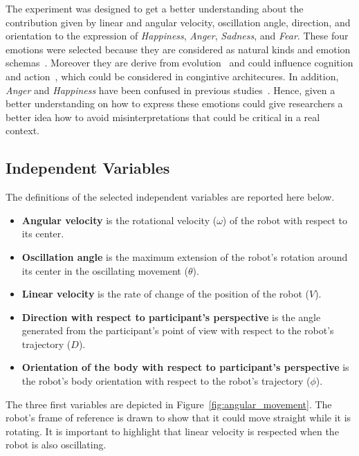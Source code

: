 The experiment was designed to get a better understanding about the contribution given by linear and angular velocity, oscillation angle, direction, and orientation to the expression of \textit{Happiness}, \textit{Anger}, \textit{Sadness}, and \textit{Fear}. These four emotions were selected because they are considered as natural kinds and emotion schemas~\cite{Izard2007}. Moreover they are derive from evolution~\cite{Buck99} and could influence cognition and action~\cite{Campos2004}, which could be considered in congintive architecures. In addition, \textit{Anger} and \textit{Happiness} have been confused in previous studies~\cite{Angel2016}. Hence, given a better understanding on how to express these emotions could give researchers a better idea how to avoid misinterpretations that could be critical in a real context. 


\subsection{Independent Variables}

The definitions of the selected independent variables are reported here below.

\begin{itemize}
	\item \textbf{Angular velocity} is the rotational velocity  ($\omega$) of the robot with respect to its center.

	\item \textbf{Oscillation angle} is the maximum extension of the robot's rotation around its center in the oscillating movement ($\theta$).

	\item \textbf{Linear velocity} is the rate of change of the position of the robot ($V$). 

	\item \textbf{Direction with respect to participant's perspective} is the angle generated from the participant's point of view with respect to the robot's trajectory ($D$).

	\item \textbf{Orientation of the body with respect to participant's perspective} is the robot's body orientation with respect to the robot's trajectory ($\phi$).

\end{itemize}

The three first variables are depicted in Figure~\ref{fig:angular_movement}. The robot's frame of reference is drawn to show that it could move straight while it is rotating. It is important to highlight that linear velocity is respected when the robot is also oscillating.


